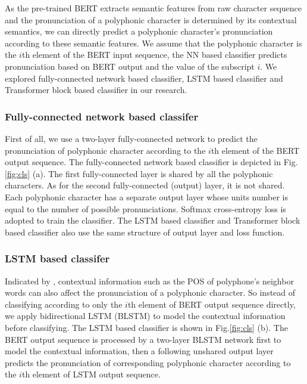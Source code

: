 \documentclass[a4paper]{article}
\begin{document}
As the pre-trained BERT extracts semantic features from raw character sequence and the pronunciation of a polyphonic character is determined by its contextual semantics, we can directly predict a polyphonic character's pronunciation according to these semantic features. We assume that the polyphonic character is the $i$th element of the BERT input sequence, the NN based classifier predicts pronunciation based on BERT output and the value of the subscript $i$. We explored fully-connected network based classifier, LSTM based classifier and Transformer block based classifier in our research.

\subsubsection{Fully-connected network based classifer}


First of all, we use a two-layer fully-connected network to predict the pronunciation of polyphonic character according to the $i$th element of the BERT output sequence. The fully-connected network based classifier is depicted in Fig.\ref{fig:cls} (a). The first fully-connected layer is shared by all the polyphonic characters. As for the second fully-connected (output) layer, it is not shared.  Each polyphonic character has a separate output layer whose units number is equal to the number of possible pronunciations. Softmax cross-entropy loss is adopted to train the classifier. The  LSTM based classifier and Transformer block based classifier also use the same structure of output layer and loss function.


\subsubsection{LSTM based classifer}


Indicated by \cite{shan2016bi}, contextual information such as the POS of polyphone's neighbor words can also affect the pronunciation of a polyphonic character.  So instead of classifying according to only the $i$th element of BERT output sequence directly, we apply bidirectional LSTM (BLSTM) to model the contextual information before classifying. The LSTM based classifier is shown in Fig.\ref{fig:cls} (b). The BERT output sequence is processed by a two-layer BLSTM network first to model the contextual information, then a following unshared output layer predicts the pronunciation of corresponding polyphonic character according to the $i$th element of LSTM output sequence. 
\end{document}
